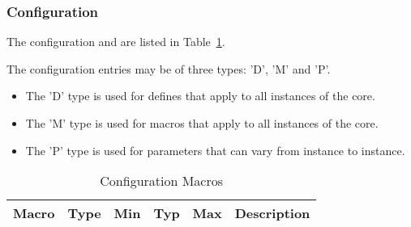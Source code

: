 \subsubsection{Configuration}
\label{sec:cm}

The configuration  and are listed in
Table~\ref{tab:confs}.

The configuration entries may be of three types: 'D', 'M' and 'P'.

\begin{itemize}
    \itemsep-0.5em
    \item The 'D' type is used for defines that apply to all instances of the core.
    \item The 'M' type is used for macros that apply to all instances of the core.
    \item The 'P' type is used for parameters that can vary from instance to instance.
\end{itemize}

\begin{longtable}{|l|c|c|c|c|p{9cm}|}
    \caption{Configuration Macros}\label{tab:confs}\\ \hline
    \rowcolor{iob-green}
    {\bf Macro} & {\bf Type} & {\bf Min} & {\bf Typ} & {\bf Max} & {\bf Description}
    \\ \hline \hline
    
\end{longtable}
